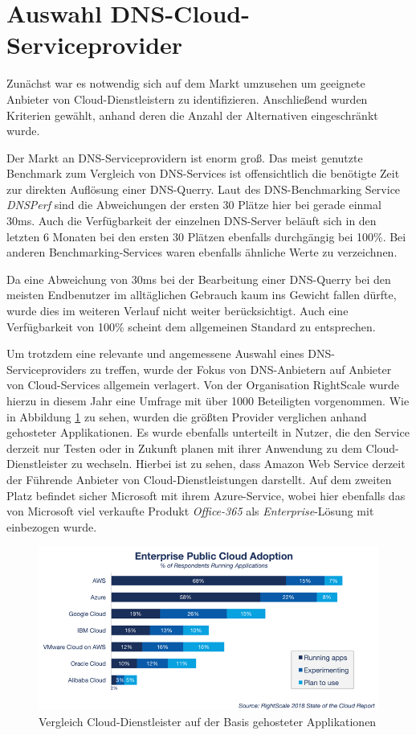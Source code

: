 \section{Auswahl DNS-Cloud-Serviceprovider}
Zunächst war es notwendig sich auf dem Markt umzusehen um geeignete Anbieter von Cloud-Dienstleistern zu identifizieren. Anschließend wurden Kriterien gewählt, anhand deren die Anzahl der Alternativen eingeschränkt wurde. 

Der Markt an DNS-Serviceprovidern ist enorm groß. Das meist genutzte Benchmark zum Vergleich von DNS-Services ist offensichtlich die benötigte Zeit zur direkten Auflösung einer DNS-Querry. Laut des DNS-Benchmarking Service \textit{DNSPerf} sind die Abweichungen der ersten 30 Plätze hier bei gerade einmal 30ms. Auch die Verfügbarkeit der einzelnen DNS-Server beläuft sich in den letzten 6 Monaten bei den ersten 30 Plätzen ebenfalls durchgängig bei 100\%. Bei anderen Benchmarking-Services waren ebenfalls ähnliche Werte zu verzeichnen. \cite{DNSPerf.2018}

Da eine Abweichung von 30ms bei der Bearbeitung einer DNS-Querry bei den meisten Endbenutzer im alltäglichen Gebrauch kaum ins Gewicht fallen dürfte, wurde dies im weiteren Verlauf nicht weiter berücksichtigt. Auch eine Verfügbarkeit von 100\% scheint dem allgemeinen Standard zu entsprechen.

Um trotzdem eine relevante und angemessene Auswahl eines DNS-Serviceproviders zu treffen, wurde der Fokus von DNS-Anbietern auf Anbieter von Cloud-Services allgemein verlagert. Von der Organisation RightScale wurde hierzu in diesem Jahr eine Umfrage mit über 1000 Beteiligten vorgenommen. Wie in Abbildung \ref{fig:cloudProvComp} zu sehen, wurden die größten Provider verglichen anhand gehosteter Applikationen. Es wurde ebenfalls unterteilt in Nutzer, die den Service derzeit nur Testen oder in Zukunft planen mit ihrer Anwendung zu dem Cloud-Dienstleister zu wechseln. Hierbei ist zu sehen, dass Amazon Web Service derzeit der Führende Anbieter von Cloud-Dienstleistungen darstellt. Auf dem zweiten Platz befindet sicher Microsoft mit ihrem Azure-Service, wobei hier ebenfalls das von Microsoft viel verkaufte Produkt \textit{Office-365} als \textit{Enterprise}-Lösung mit einbezogen wurde. \cite{ZDNet.2018b}

\begin{figure}[ht]
\includegraphics[width=\columnwidth]{images/rs_cloudComp.png}
\caption{Vergleich Cloud-Dienstleister auf der Basis gehosteter Applikationen}
\label{fig:cloudProvComp}
\end{figure}

